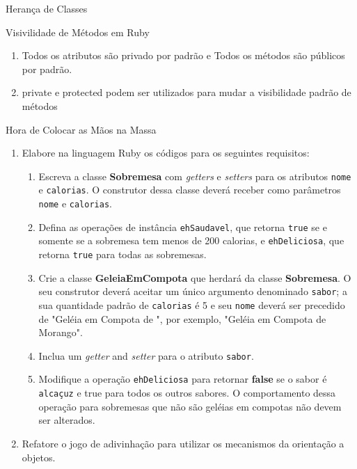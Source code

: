\begin{frame}{Herança de Classes}    
  
 \end{frame}
\begin{frame}[fragile, t]{Visivilidade de Métodos em Ruby}
  \begin{enumerate}
    \item Todos os atributos são \alert{privado} por padrão e Todos os métodos
    são públicos por padrão.
    \item \alert{private} e \alert{protected} podem ser utilizados
    para mudar a visibilidade padrão de \alert{métodos}
  \end{enumerate}
\end{frame}
\begin{frame}{Hora de Colocar as Mãos na Massa}
  \begin{enumerate}
    \item Elabore na linguagem Ruby os códigos para os seguintes requisitos:
    \begin{enumerate}
          \item Escreva a classe \textbf{Sobremesa} com \textit{getters} e \textit{setters} para os atributos \texttt{nome} e \texttt{calorias}. O construtor dessa classe deverá receber como parâmetros \texttt{nome} e \texttt{calorias}.      
          \item Defina as operações de instância \texttt{ehSaudavel}, que retorna \texttt{true} se e somente se a sobremesa tem menos de 200 calorias, e \texttt{ehDeliciosa}, que retorna \texttt{true} para todas as sobremesas.
          \item Crie a classe \textbf{GeleiaEmCompota} que herdará da classe \textbf{Sobremesa}. O seu construtor deverá aceitar um único argumento denominado \texttt{sabor};  a sua quantidade padrão de \texttt{calorias} é 5 e seu \texttt{nome} deverá ser precedido de "Geléia em Compota de ", por exemplo, "Geléia em Compota de Morango".
          \item Inclua um \textit{getter} and \textit{setter} para o atributo \texttt{sabor}.   
          \item Modifique a operação \texttt{ehDeliciosa} para retornar \textbf{false} se o sabor é \texttt{alcaçuz} e true para todos os outros sabores. O comportamento dessa operação para sobremesas que não são geléias em compotas não devem ser alterados.
    \end{enumerate}  
    \item Refatore o jogo de adivinhação para utilizar os mecanismos da orientação a 
    objetos.  
  \end{enumerate}
\end{frame}

